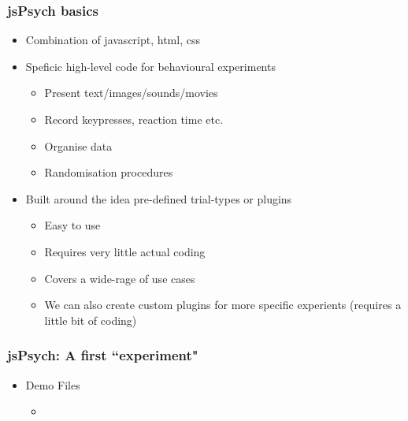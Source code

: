 \documentclass[t]{beamer}
\begin{document}
\begin{frame}[fragile]
    \frametitle{jsPsych basics}
    \begin{itemize}
        \item Combination of javascript, html, css
        \item Speficic high-level code for behavioural experiments 
            \begin{itemize}
                \item Present text/images/sounds/movies
                \item Record keypresses, reaction time etc.
                \item Organise data 
                \item Randomisation procedures
            \end{itemize}
        \item Built around the idea pre-defined trial-types or plugins
            \begin{itemize}
                \item Easy to use 
                \item Requires very little actual coding
                \item Covers a wide-rage of use cases 
                \item We can also create custom plugins for more specific experients (requires a little bit of coding)
            \end{itemize}
    \end{itemize}
\end{frame}


\begin{frame}[fragile]
    \frametitle{jsPsych: A first ``experiment"}
    \begin{itemize}
        \item Demo Files
            \begin{itemize}
                \item
            \end{itemize}
    \end{itemize}
\end{frame}


\end{document}
